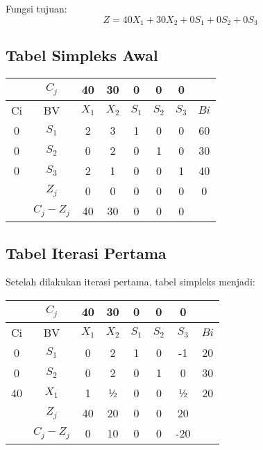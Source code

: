 \documentclass[12pt,a4paper]{article}
\begin{document}
Fungsi tujuan:
\[
Z = 40X_1 + 30X_2 + 0S_1 + 0S_2 + 0S_3
\]

\subsection*{Tabel Simpleks Awal}
\begin{center}
\begin{tabular}{|c|c|c|c|c|c|c|c|}
\hline
 & $C_j$ & 40 & 30 & 0 & 0 & 0 & \\
\hline
Ci & BV & $X_1$ & $X_2$ & $S_1$ & $S_2$ & $S_3$ & $Bi$ \\
\hline
0 & $S_1$ & 2 & 3 & 1 & 0 & 0 & 60 \\
0 & $S_2$ & 0 & 2 & 0 & 1 & 0 & 30 \\
0 & $S_3$ & 2 & 1 & 0 & 0 & 1 & 40 \\
\hline
 & $Z_j$ & 0 & 0 & 0 & 0 & 0 & 0 \\
\hline
 & $C_j-Z_j$ & 40 & 30 & 0 & 0 & 0 & \\
\hline
\end{tabular}
\end{center}

\subsection*{Tabel Iterasi Pertama}
Setelah dilakukan iterasi pertama, tabel simpleks menjadi:
\begin{center}
\begin{tabular}{|c|c|c|c|c|c|c|c|}
\hline
 & $C_j$ & 40 & 30 & 0 & 0 & 0 & \\
\hline
Ci & BV & $X_1$ & $X_2$ & $S_1$ & $S_2$ & $S_3$ & $Bi$ \\
\hline
0 & $S_1$ & 0 & 2 & 1 & 0 & -1 & 20 \\
0 & $S_2$ & 0 & 2 & 0 & 1 & 0 & 30 \\
40 & $X_1$ & 1 & ½ & 0 & 0 & ½ & 20 \\
\hline
 & $Z_j$ & 40 & 20 & 0 & 0 & 20 & \\
\hline
 & $C_j-Z_j$ & 0 & 10 & 0 & 0 & -20 & \\
\hline
\end{tabular}
\end{center}
\end{document}
